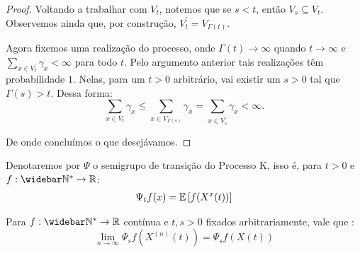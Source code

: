 \begin{proof}
  Voltando a trabalhar com $V_t$, notemos que se $s < t$, então $V_s
  \subseteq V_t$. Observemos ainda que, por construção, $V^\prime_t =
  V_{\Gamma(t)}$.

  Agora fixemos uma realização do processo, onde $\Gamma(t) \to
  \infty$ quando $t \to \infty$ e $\sum_{x \in V^\prime_t} \gamma_x <
  \infty$ para todo $t$. Pelo argumento anterior tais realizações têm
  probabilidade $1$. Nelas, para um $t > 0$ arbitrário, vai existir
  um $s > 0$ tal que $\Gamma(s) > t$. Dessa forma:
  \begin{displaymath}
    \sum_{x \in V_t} \gamma_x \leq \sum_{x \in V_{\Gamma(s)}}
    \gamma_x =
    \sum_{x \in V^\prime_s} \gamma_x < \infty.
  \end{displaymath}

  De onde concluímos o que desejávamos.
\end{proof}


\begin{definicao}
  \label{def:semigrupo}
  Denotaremos por $\Psi$ o semigrupo de transição do Processo K, isso
  é, para $t > 0$ e $f: \Nzb \to \R$:
  \begin{gather*}
    \Psi_t f (x) = {\mathbb{E}} \left[ f(X^x(t)) \right]
  \end{gather*}
\end{definicao}

\begin{proposicao}
  \label{prop:semigrupo-quase-continuo}
  Para $f: \Nzb \to \R$ contínua e $t, s > 0$ fixados arbitrariamente,
  vale que \qc:
  \begin{equation}
    \label{eq:semigrupo-quase-continuo}
    \lim_{n \to \infty} \Psi_s f (X^{(n)}(t)) = \Psi_s f(X(t))
  \end{equation}
\end{proposicao}

